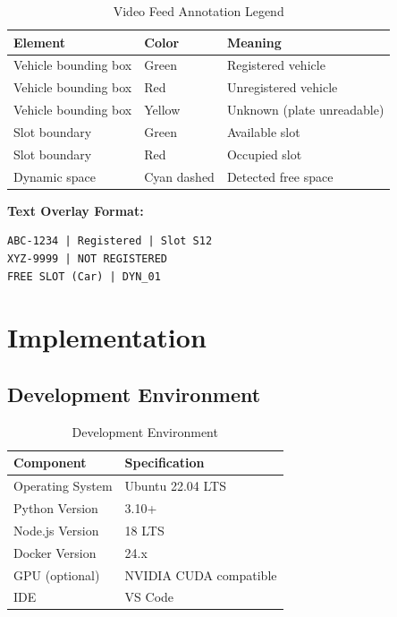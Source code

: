 \documentclass[12pt,a4paper]{report}
\begin{document}
\begin{table}[H]
\centering
\caption{Video Feed Annotation Legend}
\begin{tabular}{|l|l|l|}
\hline
\textbf{Element} & \textbf{Color} & \textbf{Meaning} \\
\hline
Vehicle bounding box & Green & Registered vehicle \\
\hline
Vehicle bounding box & Red & Unregistered vehicle \\
\hline
Vehicle bounding box & Yellow & Unknown (plate unreadable) \\
\hline
Slot boundary & Green & Available slot \\
\hline
Slot boundary & Red & Occupied slot \\
\hline
Dynamic space & Cyan dashed & Detected free space \\
\hline
\end{tabular}
\end{table}

\textbf{Text Overlay Format:}
\begin{lstlisting}[caption=Video Overlay Text]
ABC-1234 | Registered | Slot S12
XYZ-9999 | NOT REGISTERED
FREE SLOT (Car) | DYN_01
\end{lstlisting}


\chapter{Implementation}

\section{Development Environment}

\begin{table}[H]
\centering
\caption{Development Environment}
\begin{tabular}{|l|l|}
\hline
\textbf{Component} & \textbf{Specification} \\
\hline
Operating System & Ubuntu 22.04 LTS \\
\hline
Python Version & 3.10+ \\
\hline
Node.js Version & 18 LTS \\
\hline
Docker Version & 24.x \\
\hline
GPU (optional) & NVIDIA CUDA compatible \\
\hline
IDE & VS Code \\
\hline
\end{tabular}
\end{table}
\end{document}
